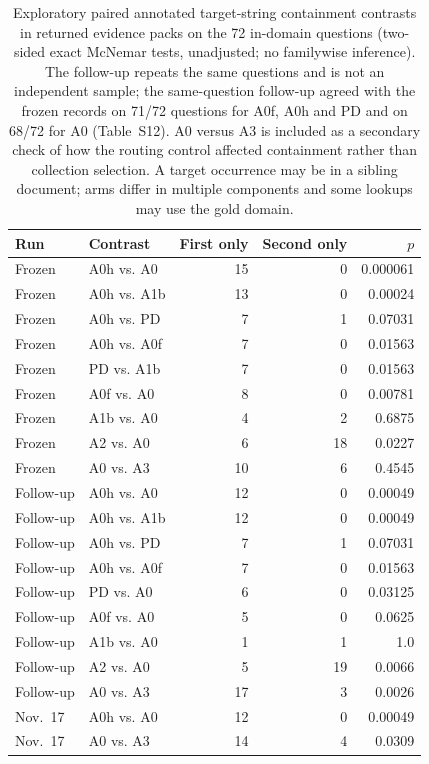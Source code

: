 \begin{table}[t]
\centering\small
\caption{Exploratory paired annotated target-string containment contrasts in
returned evidence packs on the 72 in-domain questions (two-sided exact
McNemar tests, unadjusted; no familywise inference). The follow-up repeats the
same questions and is not an independent sample; the same-question follow-up
agreed with the frozen records on 71/72 questions for A0f, A0h and PD and
on 68/72 for A0 (Table~S12). A0 versus A3 is included as a
secondary check of how the routing control affected containment rather
than collection selection. A target occurrence
may be in a sibling document; arms differ in multiple components and some
lookups may use the gold domain.}
\label{tab:s-paired-data}
\begin{tabular}{llrrr}
\toprule
Run & Contrast & First only & Second only & $p$ \\
\midrule
Frozen & A0h vs. A0 & 15 & 0 & 0.000061 \\
Frozen & A0h vs. A1b & 13 & 0 & 0.00024 \\
Frozen & A0h vs. PD & 7 & 1 & 0.07031 \\
Frozen & A0h vs. A0f & 7 & 0 & 0.01563 \\
Frozen & PD vs. A1b & 7 & 0 & 0.01563 \\
Frozen & A0f vs. A0 & 8 & 0 & 0.00781 \\
Frozen & A1b vs. A0 & 4 & 2 & 0.6875 \\
Frozen & A2 vs. A0 & 6 & 18 & 0.0227 \\
Frozen & A0 vs. A3 & 10 & 6 & 0.4545 \\
Follow-up & A0h vs. A0 & 12 & 0 & 0.00049 \\
Follow-up & A0h vs. A1b & 12 & 0 & 0.00049 \\
Follow-up & A0h vs. PD & 7 & 1 & 0.07031 \\
Follow-up & A0h vs. A0f & 7 & 0 & 0.01563 \\
Follow-up & PD vs. A0 & 6 & 0 & 0.03125 \\
Follow-up & A0f vs. A0 & 5 & 0 & 0.0625 \\
Follow-up & A1b vs. A0 & 1 & 1 & 1.0 \\
Follow-up & A2 vs. A0 & 5 & 19 & 0.0066 \\
Follow-up & A0 vs. A3 & 17 & 3 & 0.0026 \\
Nov.\ 17 & A0h vs. A0 & 12 & 0 & 0.00049 \\
Nov.\ 17 & A0 vs. A3 & 14 & 4 & 0.0309 \\
\bottomrule
\end{tabular}
\end{table}
